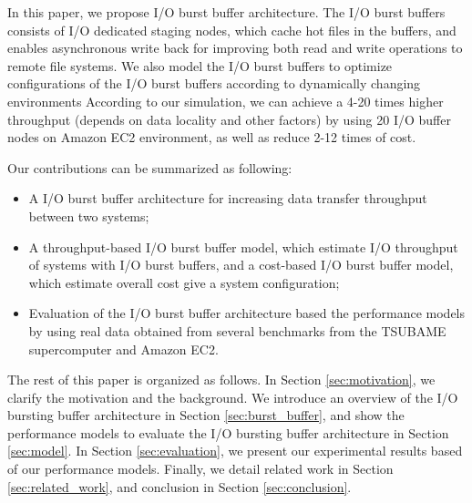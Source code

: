 In this paper, we propose I/O burst buffer architecture. The I/O burst buffers consists of I/O dedicated staging nodes, which cache hot files in the buffers, and enables asynchronous write back for improving both read and write operations to remote file systems.
We also model the I/O burst buffers to optimize  configurations of the I/O burst buffers according to dynamically changing environments
According to our simulation, we can achieve a 4-20 times higher throughput (depends on data locality and other factors) by using 20 I/O buffer nodes on Amazon EC2 environment, as well as reduce 2-12 times of cost.


Our contributions can be summarized as following:
\begin{itemize}
	\item A I/O burst buffer architecture for increasing data transfer throughput between two systems;
	\item A throughput-based I/O burst buffer model, which estimate I/O throughput of systems with I/O burst buffers, and a cost-based I/O burst buffer model, which estimate overall cost give a system configuration;
        \item Evaluation of the I/O burst buffer architecture based the performance models by using real data obtained from several benchmarks from the TSUBAME supercomputer and Amazon EC2.
\end{itemize}
The rest of this paper is organized as follows. 
In Section \ref{sec:motivation}, we clarify the motivation and the background.
We introduce an overview of the I/O bursting buffer architecture in Section \ref{sec:burst_buffer}, 
and show the performance models to evaluate the I/O bursting buffer architecture in Section \ref{sec:model}. 
In Section \ref{sec:evaluation}, we present our experimental results based of our performance models. %
Finally, we detail related work in Section \ref{sec:related_work}, and conclusion in Section \ref{sec:conclusion}.
